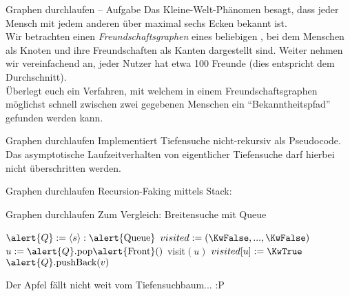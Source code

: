\begin{frame}{Graphen durchlaufen – Aufgabe}
	Das Kleine-Welt-Phänomen besagt, dass jeder Mensch mit jedem anderen über maximal sechs Ecken bekannt ist.\\
	\medskip
	Wir betrachten einen \emph{Freundschaftsgraphen} eines beliebigen , bei dem Menschen als Knoten und ihre Freundschaften als Kanten dargestellt sind.
	Weiter nehmen wir vereinfachend an, jeder Nutzer hat etwa 100 Freunde (dies entspricht dem Durchschnitt).\\
	\medskip
	Überlegt euch ein Verfahren, mit welchem in einem Freundschaftsgraphen möglichst schnell zwischen zwei gegebenen Menschen ein \enquote{Bekanntheitspfad} gefunden werden kann.
\end{frame}

\begin{frame}
	\solutionheading
\end{frame}


\begin{frame}{Graphen durchlaufen}
	Implementiert Tiefensuche nicht-rekursiv als Pseudocode. Das asymptotische Laufzeitverhalten von eigentlicher Tiefensuche darf hierbei nicht überschritten werden.
\end{frame}

\begin{frame}{Graphen durchlaufen}
	\solutionheading
	Recursion-Faking mittels Stack: 
	\begin{algorithm}[H]
	\end{algorithm}
	\vphantom{\impl Tp}
\end{frame}

\begin{frame}{Graphen durchlaufen}
	\solutionheading
	Zum Vergleich: Breitensuche mit Queue
	\begin{algorithm}[H]
		 {
			$\alert{Q} := \llist{s}: \alert{\|Queue|}$ \;
			$visited := (\KwFalse, ... , \KwFalse)$\;
			 {
				$u := \alert{Q}.\text{pop\alert{Front}}()$\;
				 {
					visit$(u)$  \;
					$visited[u] := \KwTrue$\;
					 {
						$\alert{Q}.\text{pushBack}(v)$\;
					}
				}
			}
		}
	\end{algorithm}
	\impl Der Apfel fällt nicht weit vom Tiefensuchbaum... :P
\end{frame}



